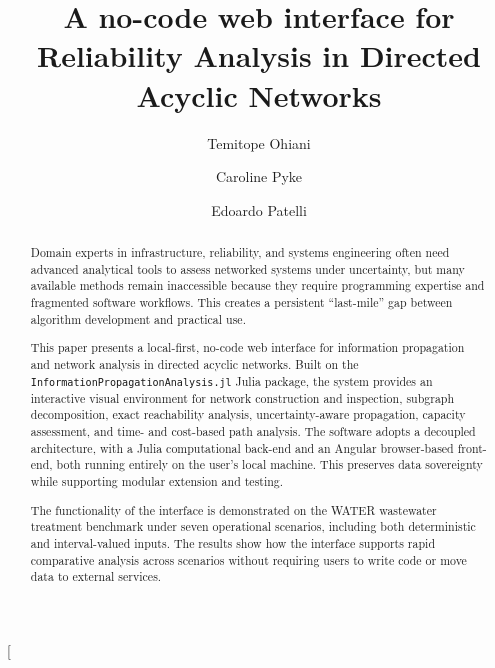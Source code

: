 \documentclass[twocolumn]{rps-esrel2026}
\begin{document}

\twocolumn[

\title{A no-code web interface for Reliability Analysis in Directed Acyclic Networks}

\author{Temitope Ohiani }

\address{Department of Civil and Environmental Engineering, University of Strathclyde, UK. }


\author{Caroline Pyke}

\address{United Kingdom National Nuclear Laboratory, UK. }

\author{Edoardo Patelli}
\address{Department of Civil and Environmental Engineering, University of Strathclyde, UK. }

\begin{abstract}
Domain experts in infrastructure, reliability, and systems engineering often need advanced analytical tools to assess networked systems under uncertainty, but many available methods remain inaccessible because they require programming expertise and fragmented software workflows. This creates a persistent “last-mile” gap between algorithm development and practical use.

This paper presents a local-first, no-code web interface for information propagation and network analysis in directed acyclic networks. Built on the \texttt{InformationPropagationAnalysis.jl} Julia package, the system provides an interactive visual environment for network construction and inspection, subgraph decomposition, exact reachability analysis, uncertainty-aware propagation, capacity assessment, and time- and cost-based path analysis. The software adopts a decoupled architecture, with a Julia computational back-end and an Angular browser-based front-end, both running entirely on the user’s local machine. This preserves data sovereignty while supporting modular extension and testing.

The functionality of the interface is demonstrated on the WATER wastewater treatment benchmark under seven operational scenarios, including both deterministic and interval-valued inputs. The results show how the interface supports rapid comparative analysis across scenarios without requiring users to write code or move data to external services.
\end{abstract}
\end{document}
